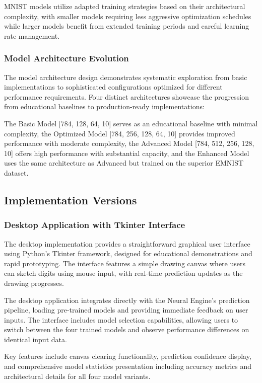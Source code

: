 \documentclass[11pt,a4paper]{report}
\begin{document}
MNIST models utilize adapted training strategies based on their architectural complexity, with smaller models requiring less aggressive optimization schedules while larger models benefit from extended training periods and careful learning rate management.

\subsubsection{Model Architecture Evolution}

The model architecture design demonstrates systematic exploration from basic implementations to sophisticated configurations optimized for different performance requirements. Four distinct architectures showcase the progression from educational baselines to production-ready implementations:

The Basic Model [784, 128, 64, 10] serves as an educational baseline with minimal complexity, the Optimized Model [784, 256, 128, 64, 10] provides improved performance with moderate complexity, the Advanced Model [784, 512, 256, 128, 10] offers high performance with substantial capacity, and the Enhanced Model uses the same architecture as Advanced but trained on the superior EMNIST dataset.

\subsection{Implementation Versions}

\subsubsection{Desktop Application with Tkinter Interface}

The desktop implementation provides a straightforward graphical user interface using Python's Tkinter framework, designed for educational demonstrations and rapid prototyping. The interface features a simple drawing canvas where users can sketch digits using mouse input, with real-time prediction updates as the drawing progresses.

The desktop application integrates directly with the Neural Engine's prediction pipeline, loading pre-trained models and providing immediate feedback on user inputs. The interface includes model selection capabilities, allowing users to switch between the four trained models and observe performance differences on identical input data.

Key features include canvas clearing functionality, prediction confidence display, and comprehensive model statistics presentation including accuracy metrics and architectural details for all four model variants.
\end{document}
